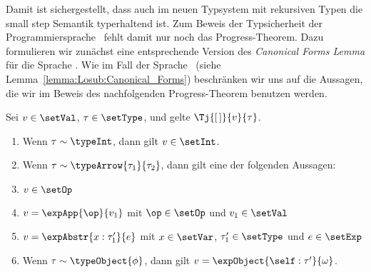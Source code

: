 Damit ist sichergestellt, dass auch im neuen Typsystem mit rekursiven Typen die small step Semantik typerhaltend ist. Zum
Beweis der Typsicherheit der Programmiersprache \Lort\ fehlt damit nur noch das Progress-Theorem. Dazu formulieren wir
zun\"achst eine entsprechende Version des {\em Canonical Forms Lemma} f\"ur die Sprache \Lort. Wie im Fall der
Sprache \Losub\ (siehe Lemma~\ref{lemma:Losub:Canonical_Forms}) beschr\"anken wir uns auf die Aussagen, die wir im Beweis
des nachfolgenden Progress-Theorem benutzen werden.

\begin{lemma} \label{lemma:Lort:Canonical_Forms}
  Sei $v\in\setVal$, $\tau\in\setType$, und gelte $\Tj{[\,]}{v}{\tau}$.
  \begin{enumerate}
    \item Wenn $\tau \sim \typeInt$, dann gilt $v\in\setInt$.

    \item Wenn $\tau \sim \typeArrow{\tau_1}{\tau_2}$, dann gilt eine der folgenden Aussagen:
          \PROOFCASEbeg
            \item $v\in\setOp$
            \item $v=\expApp{\op}{v_1}$ mit $\op\in\setOp$ und $v_1\in\setVal$
            \item $v=\expAbstr{x:\tau_1'}{e}$ mit $x\in\setVar$, $\tau_1'\in\setType$ und $e\in\setExp$
          \PROOFCASEend

    \item Wenn $\tau \sim \typeObject{\phi}$, dann gilt $v=\expObject{\self:\tau'}{\omega}$.
  \end{enumerate}
\end{lemma}

